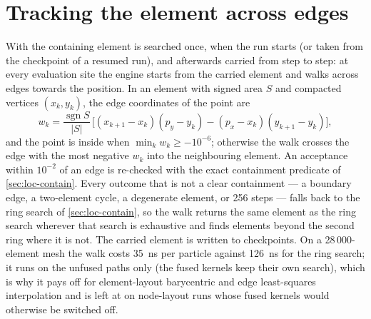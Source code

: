 
\section{Tracking the element across edges}\label{sec:loc-walk}

With  the containing element is searched once, when the run starts
(or taken from the checkpoint of a resumed run), and afterwards carried from step to step: at every evaluation site the engine starts from
the carried element and walks across edges towards the position. In an element with signed area $S$
and compacted vertices $(x_k,y_k)$, the edge coordinates of the point are
\begin{equation}\label{eq:loc-walk}
  w_k=\frac{\operatorname{sgn}S}{|S|}\,\bigl[(x_{k+1}-x_k)(p_y-y_k)-(p_x-x_k)(y_{k+1}-y_k)\bigr],
\end{equation}
and the point is inside when $\min_k w_k\ge-10^{-6}$; otherwise the walk crosses the edge with the
most negative $w_k$ into the neighbouring element. An acceptance within $10^{-2}$ of an edge is
re-checked with the exact containment predicate of \cref{sec:loc-contain}. Every outcome that is not a
clear containment --- a boundary edge, a two-element cycle, a degenerate element, or 256 steps --- falls
back to the ring search of \cref{sec:loc-contain}, so the walk returns the same element as the ring
search wherever that search is exhaustive and finds elements beyond the second ring where it is not.
The carried element is written to checkpoints. On a 28\,000-element mesh the walk costs
\SI{35}{ns} per particle against \SI{126}{ns} for the ring search; it runs on the unfused paths only
(the fused kernels keep their own search), which is why it pays off for element-layout barycentric
and edge least-squares interpolation and is left at  on node-layout runs whose fused
kernels would otherwise be switched off.

